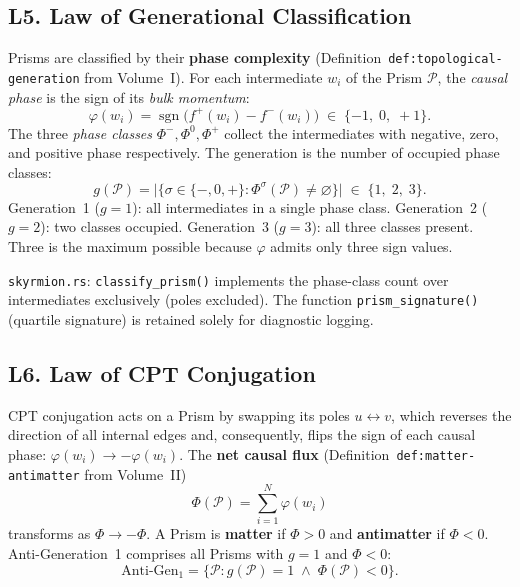 \subsection*{L5. Law of Generational Classification}
\label{law:generational-classification}

Prisms are classified by their \textbf{phase complexity}
(Definition~\texttt{def:topological-generation} from Volume~I).
For each intermediate $w_i$ of the Prism $\mathcal{P}$, the
\emph{causal phase} is the sign of its \emph{bulk momentum}:
\[
  \varphi(w_i) = \operatorname{sgn}\bigl(f^+(w_i) - f^-(w_i)\bigr)
  \;\in\; \{-1,\; 0,\; +1\}.
\]
The three \emph{phase classes} $\Phi^{-}, \Phi^{0}, \Phi^{+}$
collect the intermediates with negative, zero, and positive phase
respectively.  The generation is the number of occupied phase
classes:
\begin{equation}
  g(\mathcal{P}) = \bigl|\{\sigma \in \{-,0,+\} :
    \Phi^{\sigma}(\mathcal{P}) \neq \varnothing\}\bigr|
  \;\in\; \{1,\; 2,\; 3\}.
  \label{eq:law-generation}
\end{equation}
Generation~1 ($g=1$): all intermediates in a single phase class.
Generation~2 ($g=2$): two classes occupied.  Generation~3
($g=3$): all three classes present.  Three is the maximum possible
because $\varphi$ admits only three sign values.

\medskip\noindent
\texttt{skyrmion.rs}: \texttt{classify\_prism()} implements the phase-class
count over intermediates exclusively (poles excluded).
The function \texttt{prism\_signature()} (quartile signature) is
retained solely for diagnostic logging.

\subsection*{L6. Law of CPT Conjugation}
\label{law:cpt-conjugation}

CPT conjugation acts on a Prism by swapping its poles
$u \leftrightarrow v$, which reverses the direction of all
internal edges and, consequently, flips the sign of each causal
phase: $\varphi(w_i) \to -\varphi(w_i)$.  The \textbf{net causal
flux} (Definition~\texttt{def:matter-antimatter} from Volume~II)
\[
  \Phi(\mathcal{P}) = \sum_{i=1}^{N} \varphi(w_i)
\]
transforms as $\Phi \to -\Phi$.  A Prism is \textbf{matter}
if $\Phi > 0$ and \textbf{antimatter} if $\Phi < 0$.
Anti-Generation~1 comprises all Prisms with $g = 1$ and
$\Phi < 0$:
\begin{equation}
  \text{Anti-Gen}_1 = \bigl\{\mathcal{P} : g(\mathcal{P}) = 1
    \;\wedge\; \Phi(\mathcal{P}) < 0 \bigr\}.
  \label{eq:law-cpt}
\end{equation}

